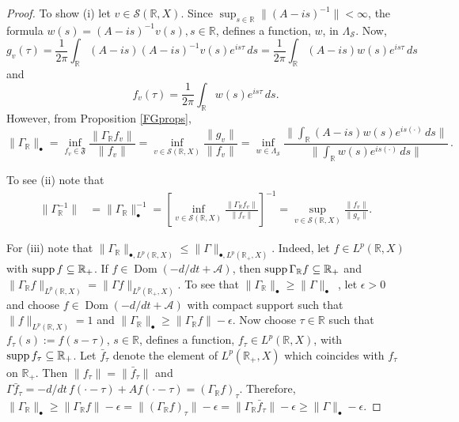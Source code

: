 \documentclass[10pt,psamsfonts,leqno]{siamltex}
\newcommand{\bbR}{\mathbb{R}}
\newcommand{\calS}{\mathcal{S}}
\newcommand{\scrF}{\mathfrak{F}}
\newcommand{\Dom}{\operatorname{Dom}}
\newcommand{\LpR}{{L^p(\bbR,X)}}
\newcommand{\LpRp}{{L^p(\bbR_+,X)}}
\newcommand{\LpRX}{{L^p(\bbR_+,X)}}
\begin{document}
\begin{proof}
To show (i) let $v\in \calS(\bbR,X)$. Since $\sup_{s\in{\mathbb
R}}\|(A-is)^{-1}\|<\infty$, the formula $w(s)=(A-is)^{-1}v(s),
 s\in \bbR$, defines a function, $w$, in $\Lambda_{\mathcal S}$.
Now,
\begin{equation*}
g_v(\tau) = \frac{1}{2\pi}
\int_\bbR (A-is)(A-is)^{-1}v(s)e^{is\tau}\,ds
 =\frac{1}{2\pi}\int_\bbR (A-is)w(s)e^{is\tau}\, ds
\end{equation*}
and
\begin{equation*}
f_v(\tau)=\frac{1}{2\pi}\int_\bbR w(s)e^{is\tau}\, ds.
\end{equation*}
However, from Proposition \ref{FGprops},
\begin{equation*}
\| \Gamma_\bbR \| _\bullet = \inf_{f_v\in \scrF}\frac{\|\Gamma_\bbR
f_v\|}{\|f_v \| }= \inf_{v\in \calS(\bbR,X)}\frac{\|g_v \|}{\|f_v\|}
=\inf_{w\in \Lambda_{\mathcal S}}
\frac{\| \int_\bbR (A-is)w(s)e^{is(\cdot)}\,
ds \| }{\| \int_\bbR w(s)e^{is(\cdot)}\, ds \| }\, .
\end{equation*}

To see (ii) note that
\begin{align*}
\| \Gamma_\bbR^{-1} \| &= \| \Gamma_\bbR \| _\bullet ^{-1} = \left[
\inf_{v\in \calS(\bbR,X)}\frac{\|\Gamma_\bbR f_v\|}{\|f_v \| }
\right]^{-1} =
\sup_{v\in \calS(\bbR,X)}\frac{\|f_v \|}{\|g_v\|}.
\end{align*}

For (iii) note that
$\| \Gamma_\bbR \| _{\bullet,\LpR} \le \| \Gamma\| _{\bullet, \LpRp}$.
  Indeed, let $f\in \LpR$ with $\supp f\subseteq \bbR_+$.  If
  $f\in \Dom(-d/dt + \mathcal{A})$, then $\supp \Gamma_\bbR f\subseteq
\bbR_+$ and $\|
\Gamma_\bbR f  \|_\LpR = \| \Gamma f \|_\LpRX$.
To see that $\| \Gamma_\bbR\| _\bullet \ge \| \Gamma \| _\bullet$\, ,
let $\epsilon>0$ and choose $f\in \Dom(-d/dt + \mathcal{A})$ with compact
support such that $\| f \|_\LpR =1$ and
$\| \Gamma_\bbR\| _\bullet \ge \|
\Gamma_\bbR f\| -\epsilon$.  Now choose $\tau \in \bbR$ such that
$f_\tau(s):= f(s-\tau)$, $s\in \bbR$, defines a function, $f_\tau \in
\LpR$, with $\supp f_\tau \subseteq \bbR_+$.  Let $\bar{f}_\tau$ denote
the element of $\LpRX$ which coincides with $f_\tau$ on $\bbR_+$.  Then
$\| f_\tau  \|=\| \bar{f}_\tau  \| $ and $\Gamma \bar{f}_\tau =-d/dt\,
f(\cdot -\tau) + Af(\cdot-\tau)=(\Gamma_\bbR f)_\tau$. Therefore, $\|
\Gamma_\bbR \| _\bullet \ge \| \Gamma_\bbR f \| -\epsilon = \|
(\Gamma_\bbR f )_\tau\| - \epsilon =  \| \Gamma_\bbR \bar{f} _\tau\|
-\epsilon \ge \| \Gamma \| _\bullet -\epsilon$.
\end{proof}
\end{document}
